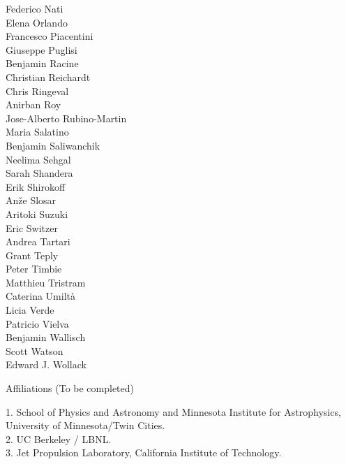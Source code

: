 \documentclass[PICOReport.tex]{subfiles}
\begin{document}
{{\begin{multicols}{4}
Federico Nati                   \\
Elena Orlando                   \\
Francesco Piacentini            \\
Giuseppe Puglisi                \\
Benjamin Racine                 \\
Christian Reichardt             \\
Chris Ringeval                  \\
Anirban Roy                     \\
Jose-Alberto Rubino-Martin      \\
Maria Salatino                  \\
Benjamin Saliwanchik            \\
Neelima Sehgal                  \\
Sarah Shandera                  \\
Erik Shirokoff                  \\
An\v{z}e Slosar                 \\
Aritoki Suzuki                  \\
Eric Switzer                    \\
Andrea Tartari                  \\
Grant Teply                     \\
Peter Timbie                    \\
Matthieu Tristram               \\
Caterina Umilt\`{a}             \\
Licia Verde                     \\
Patricio Vielva                 \\
Benjamin Wallisch               \\
Scott Watson                    \\
Edward J. Wollack               
\end{multicols}
}

\newpage
\Large  {\centerline {Affiliations  (To be completed)}}

\footnotesize {
1. School of Physics and Astronomy and Minnesota Institute for Astrophysics, University of Minnesota/Twin Cities.\\
2. UC Berkeley / LBNL.\\
3. Jet Propulsion Laboratory, California Institute of Technology.
}}
\end{document}
